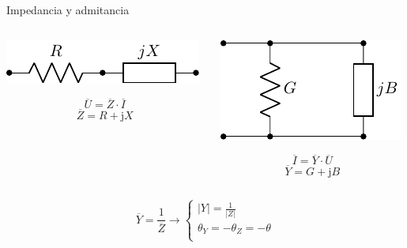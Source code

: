 \documentclass[aspectratio=169, xcolor={usenames,svgnames,dvipsnames}]{beamer}
\begin{document}
\begin{frame}{Impedancia y admitancia}
\begin{columns}
\begin{column}{0.5\columnwidth}
\begin{center}
\includegraphics[height=0.1\textheight]{../figs/Z.pdf}
\end{center}
\[
  \overline{U} = \overline{Z} \cdot \overline{I}
\]
\[
  \overline{Z} = R + \mathrm{j} X
\]
\end{column}

\begin{column}{0.5\columnwidth}
\begin{center}
\includegraphics[height=0.25\textheight]{../figs/Y.pdf}
\end{center}
\[
  \overline{I} = \overline{Y} \cdot \overline{U}
\]
\[
  \overline{Y} = G + \mathrm{j} B
\]
\end{column}
\end{columns}

\[
\boxed{
  \overline{Y} = \frac{1}{\overline{Z}} \rightarrow \left\{%
    \begin{array}{l}
      |Y| = \frac{1}{|Z|}\\
      \theta_Y = -\theta_Z = -\theta\\
      \end{array}\right.
      }
\]
\end{frame}
\end{document}

